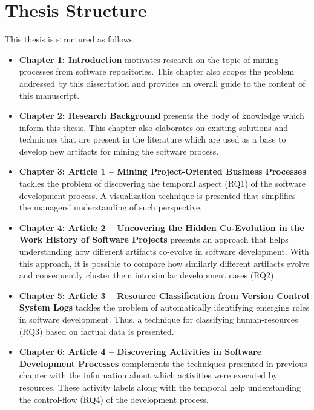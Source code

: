 \section{Thesis Structure}
\label{sec:intro-structure}


This thesis is structured as follows. 

\begin{itemize}
	\item \textbf{Chapter 1: Introduction} motivates research on the topic of mining processes from software repositories. This chapter also scopes the problem addressed by this dissertation and provides an overall guide to the content of this manuscript.
	
	\item \textbf{Chapter 2: Research Background} presents the body of knowledge which inform this thesis. 
	This chapter also elaborates on existing solutions and techniques that are present in the literature which are used as a base to develop new artifacts for mining the software process. 
	
	\item \textbf{Chapter 3: Article 1 -- Mining Project-Oriented Business Processes} tackles the problem of discovering the temporal aspect (RQ1) of the software development process. A visualization technique is presented that simplifies the managers' understanding of such perspective.
	
	\item \textbf{Chapter 4: Article 2 -- Uncovering the Hidden Co-Evolution in the Work History of Software Projects}  presents an approach that helps understanding how different artifacts co-evolve in software development. With this approach, it is possible to compare how similarly different artifacts evolve and consequently cluster them into similar development cases (RQ2).  
	
	\item \textbf{Chapter 5: Article 3 -- Resource Classification from Version Control System Logs} tackles the problem of automatically identifying emerging roles in software development. Thus, a technique for classifying human-resources (RQ3) based on factual data is presented.
	
	\item \textbf{Chapter 6: Article 4 -- Discovering Activities in Software Development Processes} complements the techniques presented in previous chapter with the information about which activities were executed by resources. These activity labels along with the temporal help understanding the control-flow (RQ4) of the development process.
	

\end{itemize}
